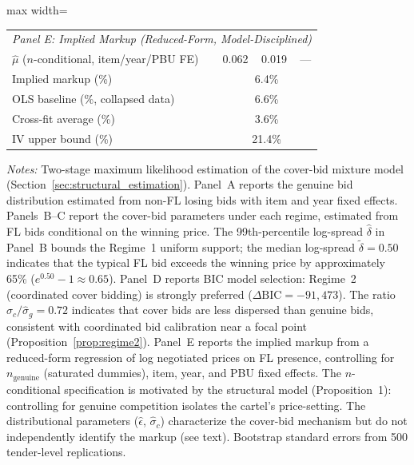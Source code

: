 \begin{table}[htbp]
\begin{adjustbox}{max width=\textwidth}
\begin{threeparttable}
\begin{tabular}{lccc}
\midrule
\multicolumn{4}{l}{\textit{Panel E: Implied Markup (Reduced-Form, Model-Disciplined)}} \\[3pt]
$\hat{\mu}$ ($n$-conditional, item/year/PBU FE) & 0.062 & 0.019 & --- \\
Implied markup (\%) & \multicolumn{3}{c}{6.4\%} \\
OLS baseline (\%, collapsed data) & \multicolumn{3}{c}{6.6\%} \\
Cross-fit average (\%) & \multicolumn{3}{c}{3.6\%} \\
IV upper bound (\%) & \multicolumn{3}{c}{21.4\%} \\
\bottomrule
\end{tabular}
\begin{tablenotes}
\small
\item \textit{Notes:} Two-stage maximum likelihood estimation of the cover-bid
mixture model (Section~\ref{sec:structural_estimation}). Panel~A reports the
genuine bid distribution estimated from non-FL losing bids with item and year
fixed effects. Panels~B--C report the cover-bid parameters under each regime,
estimated from FL bids conditional on the winning price. The 99th-percentile
log-spread $\hat{\delta}$ in Panel~B bounds the Regime~1 uniform support;
the median log-spread $\tilde{\delta} = 0.50$ indicates that the typical FL
bid exceeds the winning price by approximately 65\%
($e^{0.50} - 1 \approx 0.65$). Panel~D reports BIC model selection: Regime~2
(coordinated cover bidding) is strongly preferred ($\Delta\text{BIC} =
-91{,}473$). The ratio $\hat{\sigma}_c / \hat{\sigma}_g = 0.72$ indicates
that cover bids are less dispersed than genuine bids, consistent with
coordinated bid calibration near a focal point (Proposition~\ref{prop:regime2}).
Panel~E reports the implied markup from a reduced-form regression
of log negotiated prices on FL presence, controlling for
$n_{\text{genuine}}$ (saturated dummies), item, year, and PBU fixed
effects. The $n$-conditional specification is motivated by the
structural model (Proposition~1): controlling for genuine competition
isolates the cartel's price-setting. The distributional parameters
($\hat{\epsilon}$, $\hat{\sigma}_c$) characterize the cover-bid
mechanism but do not independently identify the markup (see text).
Bootstrap standard errors from 500 tender-level replications.
\end{tablenotes}
\end{threeparttable}
\end{adjustbox}
\end{table}
